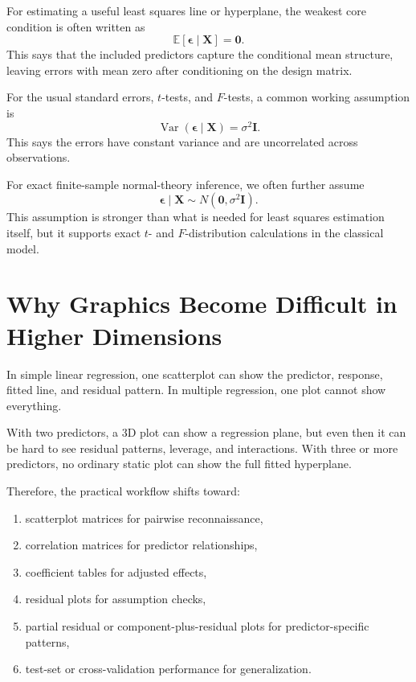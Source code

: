 For estimating a useful least squares line or hyperplane, the weakest core condition is often written as
\begin{equation}
  \mathbb{E}[\boldsymbol{\epsilon}\mid \mathbf{X}]=\mathbf{0}.
\end{equation}
This says that the included predictors capture the conditional mean structure, leaving errors with mean zero after conditioning on the design matrix.

For the usual standard errors, \(t\)-tests, and \(F\)-tests, a common working assumption is
\begin{equation}
  \operatorname{Var}(\boldsymbol{\epsilon}\mid\mathbf{X})=\sigma^2\mathbf{I}.
\end{equation}
This says the errors have constant variance and are uncorrelated across observations.

For exact finite-sample normal-theory inference, we often further assume
\begin{equation}
  \boldsymbol{\epsilon}\mid\mathbf{X}\sim N(\mathbf{0},\sigma^2\mathbf{I}).
\end{equation}
This assumption is stronger than what is needed for least squares estimation itself, but it supports exact \(t\)- and \(F\)-distribution calculations in the classical model.

\section{Why Graphics Become Difficult in Higher Dimensions}

In simple linear regression, one scatterplot can show the predictor, response, fitted line, and residual pattern.  In multiple regression, one plot cannot show everything.

With two predictors, a 3D plot can show a regression plane, but even then it can be hard to see residual patterns, leverage, and interactions.  With three or more predictors, no ordinary static plot can show the full fitted hyperplane.

Therefore, the practical workflow shifts toward:
\begin{enumerate}
  \item scatterplot matrices for pairwise reconnaissance,
  \item correlation matrices for predictor relationships,
  \item coefficient tables for adjusted effects,
  \item residual plots for assumption checks,
  \item partial residual or component-plus-residual plots for predictor-specific patterns,
  \item test-set or cross-validation performance for generalization.
\end{enumerate}

